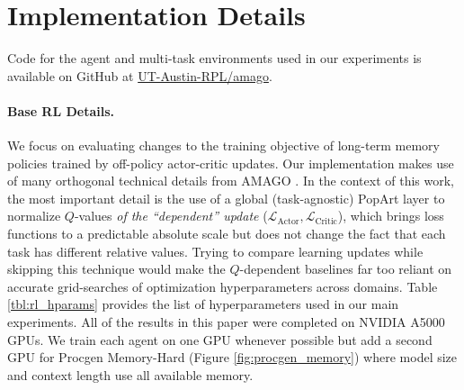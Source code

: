 \newpage

\section{Implementation Details}
\label{app:implementation}

Code for the agent and multi-task environments used in our experiments is available on GitHub at \href{https://github.com/UT-Austin-RPL/amago}{UT-Austin-RPL/amago}.


\paragraph{Base RL Details.} We focus on evaluating changes to the training objective of long-term memory policies trained by off-policy actor-critic updates. Our implementation makes use of many orthogonal technical details from AMAGO \cite{grigsby2024amago}. In the context of this work, the most important detail is the use of a global (task-agnostic) PopArt \cite{hessel2019multi} layer to normalize $Q$-values \textit{of the ``dependent'' update} ($\mathcal{L}_{\text{Actor}}, \mathcal{L}_{\text{Critic}}$), which brings loss functions to a predictable absolute scale but does not change the fact that each task has different relative values. Trying to compare learning updates while skipping this technique would make the $Q$-dependent baselines far too reliant on accurate grid-searches of optimization hyperparameters across domains. Table \ref{tbl:rl_hparams} provides the list of hyperparameters used in our main experiments. All of the results in this paper were completed on NVIDIA A5000 GPUs. We train each agent on one GPU whenever possible but add a second GPU for Procgen Memory-Hard (Figure \ref{fig:procgen_memory}) where model size and context length use all available memory.

